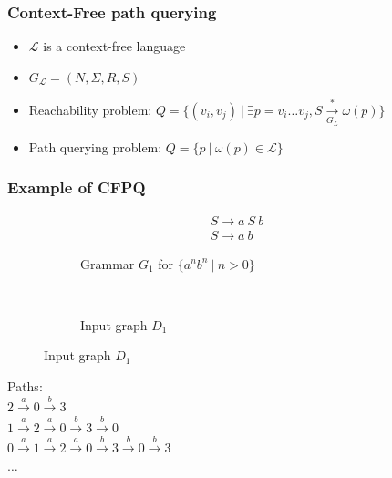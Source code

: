 \documentclass[xcolor=table]{beamer}
\begin{document}
\begin{frame} \frametitle{Context-Free path querying}
\begin{itemize}
\item $\mathcal{L}$ is a context-free language
\item $G_{\mathcal{L}} = (N,\Sigma,R,S)$
\item Reachability problem: $Q=\{(v_i,v_j) \ | \ \exists p = v_i \dots v_j, S \xrightarrow[G_L]{*} \omega(p) \}$
\item Path querying problem: $Q=\{p \ | \ \omega(p) \in \mathcal{L}\}$
\end{itemize}

\end{frame}

\begin{frame} \frametitle{Example of CFPQ}

  \begin{figure}[h]
      \centering
      \begin{subfigure}[b]{0.40\textwidth}
          \centering
          \[
           \begin{array}{l}
             S \rightarrow a \ S \ b \\
             S \rightarrow a \ b
           \end{array}
           \]
          \caption{Grammar $G_1$ for $\{a^n b^n \ | \ n > 0\}$}
      \end{subfigure}%
      ~\quad
      \begin{subfigure}[b]{0.54\textwidth}
          \centering

          \caption{Input graph $D_1$}
          \label{fig:worstCaseGraph}
      \end{subfigure}%
      \label{fig:grammar_example}
  \end{figure}
Paths: \\
$2 \xrightarrow{a} 0 \xrightarrow{b} 3$ \\
$1 \xrightarrow{a} 2 \xrightarrow{a} 0 \xrightarrow{b} 3 \xrightarrow{b} 0$ \\
$0 \xrightarrow{a} 1 \xrightarrow{a} 2 \xrightarrow{a} 0 \xrightarrow{b} 3 \xrightarrow{b} 0 \xrightarrow{b} 3$ \\
$\dots$

\end{frame}
\end{document}
